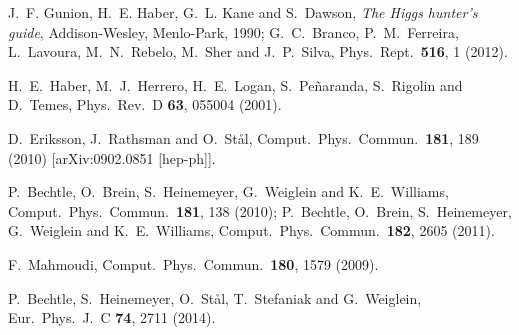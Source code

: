 
  J.~F. Gunion, H.~E. Haber, G.~L. Kane and S.~Dawson,
  \textsl{The {H}iggs hunter's guide},
  Addison-Wesley, Menlo-Park, 1990;
  G.~C.~Branco, P.~M.~Ferreira, L.~Lavoura, M.~N.~Rebelo, M.~Sher and J.~P.~Silva,
  Phys.\ Rept.\  {\bf 516}, 1 (2012).

  H.~E.~Haber, M.~J.~Herrero, H.~E.~Logan, S.~Pe\~naranda, S.~Rigolin and D.~Temes,
  Phys.\ Rev.\ D {\bf 63}, 055004 (2001).

  D.~Eriksson, J.~Rathsman and O.~St{\aa}l,
  Comput.\ Phys.\ Commun.\  {\bf 181}, 189 (2010)
  [arXiv:0902.0851 [hep-ph]].

  P.~Bechtle, O.~Brein, S.~Heinemeyer, G.~Weiglein and K.~E.~Williams,
  Comput.\ Phys.\ Commun.\  {\bf 181}, 138 (2010);
  P.~Bechtle, O.~Brein, S.~Heinemeyer, G.~Weiglein and K.~E.~Williams,
  Comput.\ Phys.\ Commun.\  {\bf 182}, 2605 (2011).

  F.~Mahmoudi,
  Comput.\ Phys.\ Commun.\  {\bf 180}, 1579 (2009).

  P.~Bechtle, S.~Heinemeyer, O.~St{\aa}l, T.~Stefaniak and G.~Weiglein,
  Eur.\ Phys.\ J.\ C {\bf 74}, 2711 (2014).

